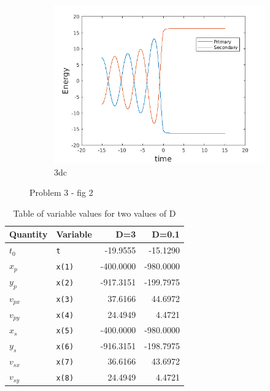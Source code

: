 \documentclass[a4paper]{article}
\begin{document}
\begin{figure}
				\begin{subfigure} {\columnwidth}
					\centering
					\includegraphics[width=.5\columnwidth]{../plots/3d_energy.png}
					\caption{3dc}
					\label{fig:3dc}
				\end{subfigure}
				\caption{Problem 3 - fig 2}
				\label{fig:3.2}
			\end{figure}
			
			\begin{table}
				\centering
				\begin{tabular} {l l r r}
					\toprule
					\textbf{Quantity} & \textbf{Variable} & \textbf{D=3} & \textbf{D=0.1}\\
					\midrule
					\(t^{}_{0}\) & \texttt{t} & -19.9555 & -15.1290 \\
					\(x^{}_{p}\) & \texttt{x(1)}& -400.0000 & -980.0000 \\
					\(y^{}_{p}\) & \texttt{x(2)} & -917.3151 & -199.7975 \\
					\(v^{}_{px}\) & \texttt{x(3)} & 37.6166 & 44.6972 \\
					\(v^{}_{py}\) & \texttt{x(4)} & 24.4949 & 4.4721 \\
					\(x^{}_{s}\) & \texttt{x(5)} & -400.0000 & -980.0000 \\
					\(y^{}_{s}\) & \texttt{x(6)} & -916.3151 & -198.7975 \\
					\(v^{}_{sx}\) & \texttt{x(7)} & 36.6166 & 43.6972 \\
					\(v^{}_{sy}\) & \texttt{x(8)} & 24.4949 & 4.4721 \\
					\bottomrule
				\end{tabular}
				\caption{Table of variable values for two values of D}
				\label{table:3_dvalues}
			\end{table}
			
			
			
			
\end{document}

